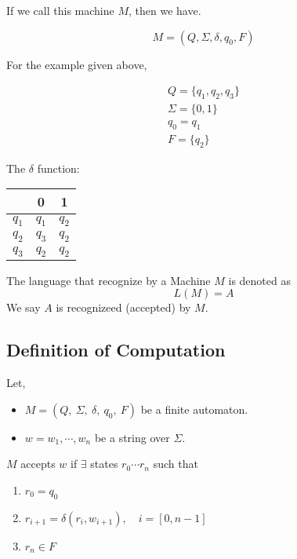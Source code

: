 If we call this machine $M$, then we have.

\[
M = (Q, \Sigma, \delta, q_0, F)
\]

\newpage

For the example given above,

\begin{gather*}
    Q=\{q_1,q_2, q_3\}\\
    \Sigma=\{0,1\}\\
    q_0 = q_1 \\
    F=\{q_2\}
\end{gather*}


The $\delta$ function:
\begin{center}
\begin{tabular}{c|cc}
    & 0 & 1\\ \hline
    $q_1$ & $q_1$ & $q_2$\\
    $q_2$ & $q_3$ & $q_2$\\
    $q_3$ & $q_2$ & $q_2$
\end{tabular}
\end{center}

\begin{definition}
    The language that recognize by a Machine $M$ is denoted as \[
        L(M) = A
    \]
    We say $A$ is recognizeed (accepted) by $M$.
\end{definition}

\subsection{Definition of Computation}

Let, 
\begin{itemize}
    \item $M = (Q,\ \Sigma,\ \delta,\ q_0,\ F)$ be a finite automaton.
    \item $w = w_1, \cdots, w_n$ be a string over $\Sigma$.
\end{itemize}

\begin{theorem}
    $M$ accepts $w$ if $\exists$ states $r_0 \cdots r_n$ such that
    \begin{enumerate}[label=(\arabic*)]
        \item $r_0 = q_0$
        \item $r_{i+1} = \delta(r_i, w_{i+1}),\quad i = [0, n-1]$
        \item $r_n \in F$
    \end{enumerate}
\end{theorem}

